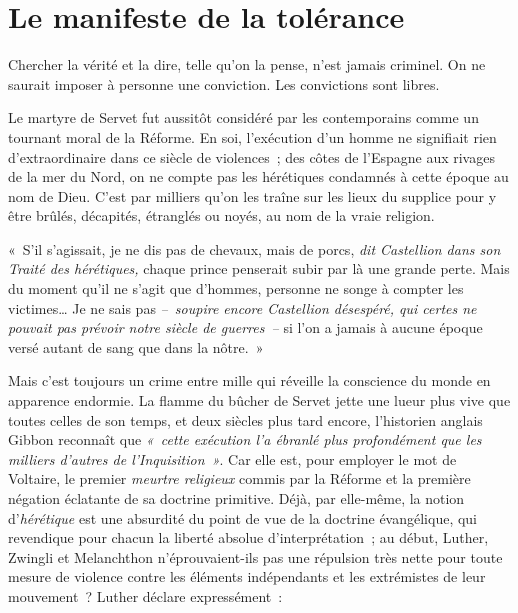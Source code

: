 \documentclass[french,twoside]{book} %
\newcommand{\bibl}[1]{{\RaggedLeft{#1}\par\bigskip}}
\newenvironment{quoteblock}%
  {\begin{quoting}}
  {\end{quoting}}
\newcommand\chapteropen{} %
\newcommand\chaptercont{} %
\newenvironment{quotebar}{%
    \def\FrameCommand{{\color{rubric!10!}\vrule width 0.5em} \hspace{0.9em}}%
    \def\OuterFrameSep{2pt} %
    \MakeFramed {\advance\hsize-\width \FrameRestore}
  }%
  {%
    \endMakeFramed
  }
\renewenvironment{quoteblock}%
  {%
    \savenotes
    \setstretch{0.9}
    \normalfont
    \begin{quotebar}
  }
  {%
    \end{quotebar}
    \spewnotes
  }
\begin{document}
\chapteropen

\chapter[{Le manifeste de la tolérance}]{Le manifeste de la tolérance}
\renewcommand{\leftmark}{Le manifeste de la tolérance}


\epigraph{\noindent Chercher la vérité et la dire, telle qu’on la pense, n’est jamais criminel. On ne saurait imposer à personne une conviction. Les convictions sont libres.\par
}{
\bibl{Sébastien Castellion}
}


\chaptercont
\noindent Le martyre de Servet fut aussitôt considéré par les contemporains comme un tournant moral de la Réforme. En soi, l’exécution d’un homme ne signifiait rien d’extraordinaire dans ce siècle de violences ; des côtes de l’Espagne aux rivages de la mer du Nord, on ne compte pas les hérétiques condamnés à cette époque au nom de Dieu. C’est par milliers qu’on les traîne sur les lieux du supplice pour y être brûlés, décapités, étranglés ou noyés, au nom de la vraie religion.\par

\begin{quoteblock}
\noindent « S’il s’agissait, je ne dis pas de chevaux, mais de porcs, \emph{dit Castellion dans son \emph{Traité des hérétiques}, }chaque prince penserait subir par là une grande perte. Mais du moment qu’il ne s’agit que d’hommes, personne ne songe à compter les victimes… Je ne sais pas \emph{– soupire encore Castellion désespéré, qui certes ne pouvait pas prévoir notre siècle de guerres –} si l’on a jamais à aucune époque versé autant de sang que dans la nôtre. »\end{quoteblock}

\noindent Mais c’est toujours un crime entre mille qui réveille la conscience du monde en apparence endormie. La flamme du bûcher de Servet jette une lueur plus vive que toutes celles de son temps, et deux siècles plus tard encore, l’historien anglais Gibbon reconnaît que \emph{« cette exécution l’a ébranlé plus profondément que les milliers d’autres de l’Inquisition »}. Car elle est, pour employer le mot de Voltaire, le premier \emph{meurtre religieux} commis par la Réforme et la première négation éclatante de sa doctrine primitive. Déjà, par elle-même, la notion d’\emph{hérétique} est une absurdité du point de vue de la doctrine évangélique, qui revendique pour chacun la liberté absolue d’interprétation ; au début, Luther, Zwingli et Melanchthon n’éprouvaient-ils pas une répulsion très nette pour toute mesure de violence contre les éléments indépendants et les extrémistes de leur mouvement ? Luther déclare expressément :\par
\end{document}
